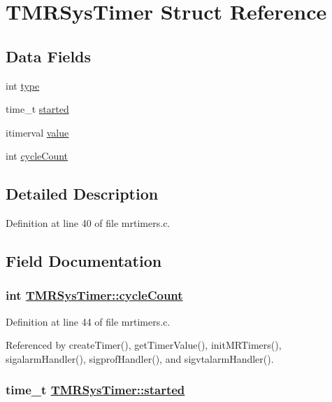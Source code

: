 \hypertarget{structTMRSysTimer}{
\section{TMRSys\-Timer Struct Reference}
\label{structTMRSysTimer}
}
\subsection*{Data Fields}
\begin{CompactItemize}
\item 
int \hyperlink{structTMRSysTimer_4b6f19be2b38b35ed1401866ec85d1bf}{type}
\item 
time\_\-t \hyperlink{structTMRSysTimer_4a98635d66efe9a7ff4980629216c88a}{started}
\item 
itimerval \hyperlink{structTMRSysTimer_582418d1e112e6ee5626fa92f6e42e0b}{value}
\item 
int \hyperlink{structTMRSysTimer_178f6c1cd23308ca9cc80e7d1312ead6}{cycle\-Count}
\end{CompactItemize}


\subsection{Detailed Description}




Definition at line 40 of file mrtimers.c.

\subsection{Field Documentation}
\hypertarget{structTMRSysTimer_178f6c1cd23308ca9cc80e7d1312ead6}{
\subsubsection[cycleCount]{\setlength{\rightskip}{0pt plus 5cm}int \hyperlink{structTMRSysTimer_178f6c1cd23308ca9cc80e7d1312ead6}{TMRSys\-Timer::cycle\-Count}}}
\label{structTMRSysTimer_178f6c1cd23308ca9cc80e7d1312ead6}




Definition at line 44 of file mrtimers.c.

Referenced by create\-Timer(), get\-Timer\-Value(), init\-MRTimers(), sigalarm\-Handler(), sigprof\-Handler(), and sigvtalarm\-Handler().\hypertarget{structTMRSysTimer_4a98635d66efe9a7ff4980629216c88a}{
\subsubsection[started]{\setlength{\rightskip}{0pt plus 5cm}time\_\-t \hyperlink{structTMRSysTimer_4a98635d66efe9a7ff4980629216c88a}{TMRSys\-Timer::started}}}
\label{structTMRSysTimer_4a98635d66efe9a7ff4980629216c88a}




